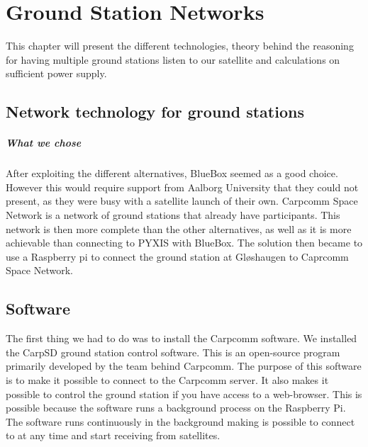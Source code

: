 \chapter{Ground Station Networks}

This chapter will present the different technologies, theory behind the reasoning for having multiple ground stations listen to our satellite and calculations on sufficient power supply. 






\section{Network technology for ground stations}





\paragraph{What we chose}
After exploiting the different alternatives, BlueBox seemed as a good choice. However this would require support from Aalborg University that they could not present, as they were busy with a satellite launch of their own. Carpcomm Space Network is a network of ground stations that already have participants. This network is then more complete than the other alternatives, as well as it is more achievable than connecting to PYXIS with BlueBox. The solution then became to use a Raspberry pi to connect the ground station at Gløshaugen to Caprcomm Space Network.
 


\section {Software}

The first thing we had to do was to install the Carpcomm software. We installed the CarpSD ground station control software. This is an open-source program primarily developed by the team behind Carpcomm. The purpose of this software is to make it possible to connect to the Carpcomm server. It also makes it possible to control the ground station if you have access to a web-browser. This is possible because the software runs a background process on the Raspberry Pi. The software runs continuously in the background making is possible to connect to at any time and start receiving from satellites.

